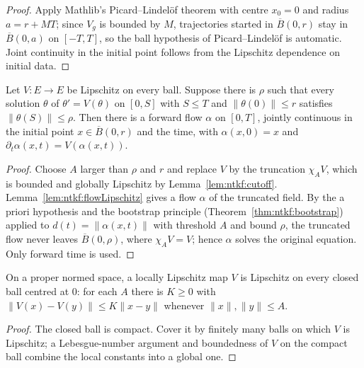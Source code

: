 \begin{proof}
  \leanok
Apply Mathlib's Picard--Lindel\"of theorem with centre $x_0=0$ and radius $a=r+MT$; since $V_g$ is
bounded by $M$, trajectories started in $\overline B(0,r)$ stay in $\overline B(0,a)$ on $[-T,T]$,
so the ball hypothesis of Picard--Lindel\"of is automatic. Joint continuity in the initial point
follows from the Lipschitz dependence on initial data.
\end{proof}

\begin{theorem}\label{thm:ntkf:flowWindow}
  \leanok
Let $V:E\to E$ be Lipschitz on every ball. Suppose there is $\rho$ such that every solution
$\theta$ of $\theta'=V(\theta)$ on $[0,S]$ with $S\le T$ and $\|\theta(0)\|\le r$ satisfies
$\|\theta(S)\|\le\rho$. Then there is a forward flow $\alpha$ on $[0,T]$, jointly continuous in
the initial point $x\in\overline B(0,r)$ and the time, with $\alpha(x,0)=x$ and
$\partial_t\alpha(x,t)=V(\alpha(x,t))$.
\end{theorem}

\begin{proof}
  \leanok
Choose $A$ larger than $\rho$ and $r$ and replace $V$ by the truncation $\chi_AV$, which is bounded and
globally Lipschitz by Lemma~\ref{lem:ntkf:cutoff}. Lemma~\ref{lem:ntkf:flowLipschitz} gives a
flow $\alpha$ of the truncated field. By the a priori hypothesis and the bootstrap principle
(Theorem~\ref{thm:ntkf:bootstrap}) applied to $d(t)=\|\alpha(x,t)\|$ with threshold $A$ and bound $\rho$, the
truncated flow never leaves $\overline B(0,\rho)$, where $\chi_AV=V$; hence $\alpha$ solves the
original equation. Only forward time is used.
\end{proof}

\begin{lemma}\label{lem:ntkf:lipBall}
  \leanok
On a proper normed space, a locally Lipschitz map $V$ is Lipschitz on every closed ball centred at
$0$: for each $A$ there is $K\ge0$ with $\|V(x)-V(y)\|\le K\|x-y\|$ whenever $\|x\|,\|y\|\le A$.
\end{lemma}

\begin{proof}
  \leanok
The closed ball is compact. Cover it by finitely many balls on which $V$ is Lipschitz; a Lebesgue-number
argument and boundedness of $V$ on the compact ball combine the local constants into a global one.
\end{proof}

